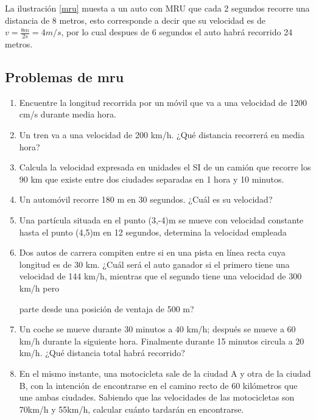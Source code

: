 La ilustración \ref{mru} muesta a un auto con MRU que cada 2 segundos recorre una distancia de 8 metros, esto  corresponde a 
decir que su velocidad es de $v = \frac{8m}{2s} = 4 m/s$, por lo cual despues de 6 segundos el auto habrá recorrido 24 metros.

\subsection{Problemas de mru}

\begin{enumerate}

\item Encuentre la longitud recorrida por un móvil que va a una velocidad de 1200 cm/s durante
 media hora. 

\item Un tren va a una velocidad de 200 km/h.
 ¿Qué distancia recorrerá en media hora? 

\item Calcula la velocidad expresada en unidades el SI de un camión que recorre los 90 km que
 existe entre dos ciudades 
separadas en 1 hora y 10 minutos. 

\item  Un automóvil recorre 180 m en 30 segundos. ¿Cuál es su
 velocidad? 

\item  Una partícula situada en el punto 
 (3,-4)m se mueve con velocidad constante hasta el punto (4,5)m en 12 segundos, 
determina la 
velocidad empleada

\item  Dos autos de carrera compiten entre si
 en una pista en
 línea recta cuya longitud es de 30 km. ¿Cuál será el auto 
ganador si el primero tiene una
 velocidad de 144 km/h, mientras que el segundo tiene una velocidad de 300 km/h pero

parte desde una posición de ventaja de 500 m?

\item Un coche se mueve durante 30 minutos a 40 km/h;
 después se mueve a 60 km/h durante la siguiente hora. Finalmente durante 
15 minutos
 circula a 20 km/h. ¿Qué distancia total habrá recorrido?
 
\item En el mismo instante, una motocicleta sale de la ciudad A y otra de la ciudad B, con la intención de encontrarse en el 
camino recto de 60 kilómetros que une ambas ciudades. Sabiendo que las velocidades de las motocicletas son 70km/h y 55km/h, 
calcular cuánto tardarán en encontrarse.


\end{enumerate}
